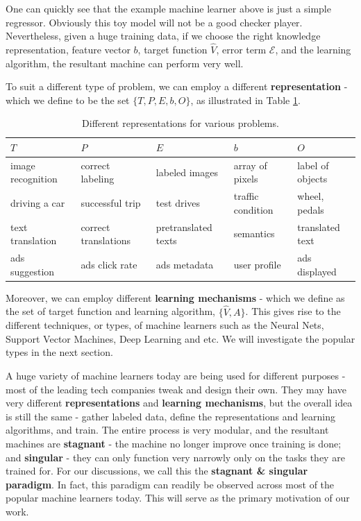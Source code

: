 \documentclass[12pt]{article}  %
\begin{document}
One can quickly see that the example machine learner above is just a simple regressor. Obviously this toy model will not be a good checker player. Nevertheless, given a huge training data, if we choose the right knowledge representation, feature vector $b$, target function $\hat{V}$, error term $\mathcal{E}$, and the learning algorithm, the resultant machine can perform very well. 

To suit a different type of problem, we can employ a different {\bf representation} - which we define to be the set $\{T, P, E, b, O\}$, as illustrated in Table \ref{rep}.



\begin{table}[h]
\begin{center}
\begin{tabular}{ | l | l | l || l | l | }

\hline
$T$ & $P$ & $E$ & $b$ & $O$ \\
\hline \hline
image recognition & correct labeling & labeled images & array of pixels & label of objects \\
\hline
driving a car & successful trip & test drives & traffic condition & wheel, pedals  \\
\hline
text translation & correct translations & pretranslated texts & semantics & translated text \\
\hline
ads suggestion & ads click rate & ads metadata & user profile & ads displayed \\
\hline
\end{tabular}
\caption{Different representations for various problems.}
\label{rep}
\end{center}
\end{table}



Moreover, we can employ different {\bf learning mechanisms} - which we define as the set of target function and learning algorithm, $\{\hat{V}, A\}$. This gives rise to the different techniques, or types, of machine learners such as the Neural Nets, Support Vector Machines, Deep Learning and etc. We will investigate the popular types in the next section.

A huge variety of machine learners today are being used for different purposes - most of the leading tech companies tweak and design their own. They may have very different {\bf representations} and {\bf learning mechanisms}, but the overall idea is still the same - gather labeled data, define the representations and learning algorithms, and train. The entire process is very modular, and the resultant machines are {\bf stagnant} - the machine no longer improve once training is done; and {\bf singular} - they can only function very narrowly only on the tasks they are trained for. For our discussions, we call this the {\bf stagnant \& singular paradigm}. In fact, this paradigm can readily be observed across most of the popular machine learners today. This will serve as the primary motivation of our work.
\end{document}
